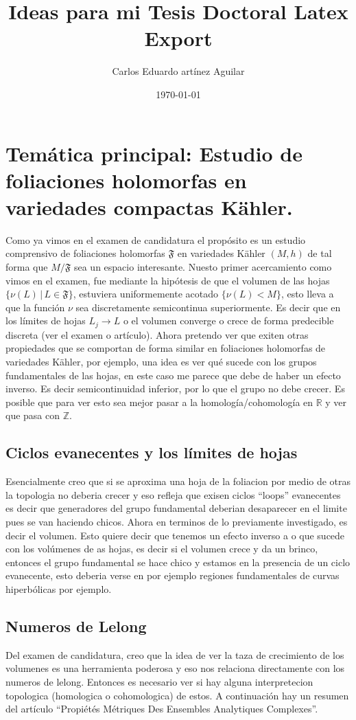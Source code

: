 \documentclass[letterpaper]{article}
\author{Carlos Eduardo artínez Aguilar}
\date{\today}
\title{Ideas para mi Tesis Doctoral Latex Export}
\newcommand{\zah}{\ensuremath{ \mathbb Z }}
\newcommand{\re}{\ensuremath{\mathbb R }}
\begin{document}
\maketitle
\tableofcontents


\section{Temática principal: Estudio de foliaciones holomorfas en variedades compactas Kähler.}
\label{sec:org8e50cf2}
\noindent Como ya vimos en el examen de candidatura el propósito es un estudio comprensivo de foliaciones holomorfas \(\mathfrak{F}\) en variedades Kähler \((M,h)\) de tal forma que \(M/\mathfrak{F}\) sea un espacio interesante. Nuesto primer acercamiento como vimos en el examen, fue mediante la hipótesis de que el volumen de las hojas \(\{ \nu(L) \,|\,L\in \mathfrak{F}\}\), estuviera uniformemente acotado \(\{\nu(L) < M\}\), esto lleva a que la función \(\nu\) sea discretamente semicontinua superiormente. Es decir que en los límites de hojas \(L_j\rightarrow L\) o el volumen converge o crece de forma predecible discreta (ver el examen o artículo). Ahora pretendo ver que exiten otras propiedades que se comportan de forma similar en foliaciones holomorfas de variedades Kähler, por ejemplo, una idea es ver qué sucede con los grupos fundamentales de las hojas, en este caso me parece que debe de haber un efecto inverso. Es decir semicontinuidad inferior, por lo que el grupo no debe crecer. Es posible que para ver esto sea mejor pasar a la homología/cohomología en \(\re\) y ver que pasa con \(\zah\).

\subsection{Ciclos evanecentes y los límites de hojas}
\label{sec:orgb5efe58}
\noindent Esencialmente creo que si se aproxima una hoja de la foliacion por medio de otras la topologia no deberia crecer y eso refleja que exisen ciclos ``loops'' evanecentes es decir que generadores del grupo fundamental deberian desaparecer en el limite pues se van haciendo chicos. Ahora en terminos de lo previamente investigado, es decir el volumen. Esto quiere decir que tenemos un efecto inverso a o que sucede con los volúmenes de as hojas, es decir si el volumen crece y da un brinco, entonces el grupo fundamental se hace chico y estamos en la presencia de un ciclo evanecente, esto deberia verse en por ejemplo regiones fundamentales de curvas hiperbólicas por ejemplo.
\subsection{Numeros de Lelong}
\label{sec:orgbdd612b}
\noindent Del examen de candidatura, creo que la idea de ver la taza de crecimiento de los volumenes es una herramienta poderosa y eso nos relaciona directamente con los numeros de lelong. Entonces es necesario ver si hay alguna interpretecion topologica (homologica o cohomologica) de estos. A continuación hay un resumen del artículo ``Propiétés Métriques Des Ensembles Analytiques Complexes''.
\end{document}
